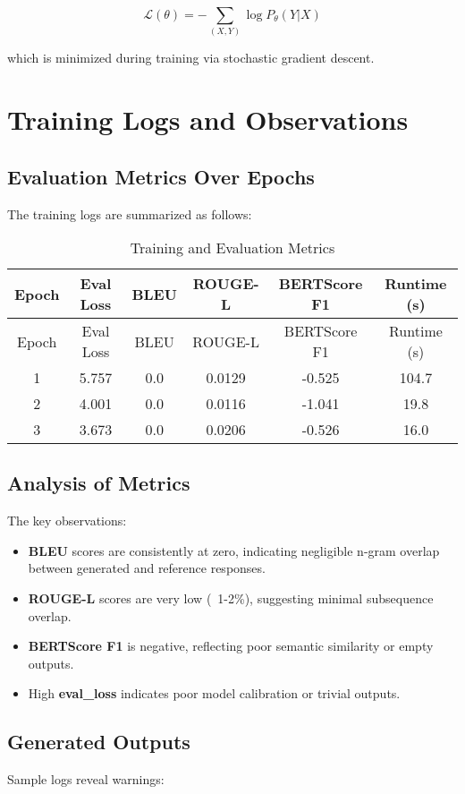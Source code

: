 \documentclass[12pt]{article}
\begin{document}
\begin{equation}
\mathcal{L}(\theta) = - \sum_{(X,Y)} \log P_\theta(Y|X)
\end{equation}

which is minimized during training via stochastic gradient descent.

\section{Training Logs and Observations}
\subsection{Evaluation Metrics Over Epochs}
The training logs are summarized as follows:

\begin{longtable}{cccccc}
\caption{Training and Evaluation Metrics} \\
\toprule
Epoch & Eval Loss & BLEU & ROUGE-L & BERTScore F1 & Runtime (s) \\
\midrule
\endfirsthead
\toprule
Epoch & Eval Loss & BLEU & ROUGE-L & BERTScore F1 & Runtime (s) \\
\midrule
\endhead
1 & 5.757 & 0.0 & 0.0129 & -0.525 & 104.7 \\
2 & 4.001 & 0.0 & 0.0116 & -1.041 & 19.8 \\
3 & 3.673 & 0.0 & 0.0206 & -0.526 & 16.0 \\
\bottomrule
\end{longtable}

\subsection{Analysis of Metrics}
The key observations:

\begin{itemize}
\item \textbf{BLEU} scores are consistently at zero, indicating negligible n-gram overlap between generated and reference responses.
\item \textbf{ROUGE-L} scores are very low (~1-2\%), suggesting minimal subsequence overlap.
\item \textbf{BERTScore F1} is negative, reflecting poor semantic similarity or empty outputs.
\item High \textbf{eval\_loss} indicates poor model calibration or trivial outputs.
\end{itemize}

\subsection{Generated Outputs}
Sample logs reveal warnings:
\end{document}
